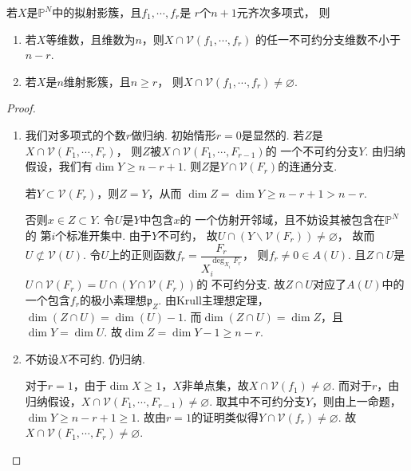     \begin{theorem}
        若$X$是$\mathbb{P}^{N}$中的拟射影簇，且$f_{1},\cdots,f_{r}$是
        $r$个$n+1$元齐次多项式，
        则
        \begin{enumerate}
            \item[(1)] 若$X$等维数，且维数为$n$，则$X \cap \mathcal{V}(f_{1},\cdots,f_{r})$
                       的任一不可约分支维数不小于$n-r$.
            \item[(2)] 若$X$是$n$维射影簇，且$n \geq r$，
                       则$X \cap \mathcal{V}(f_{1},\cdots,f_{r}) \neq \varnothing$.
        \end{enumerate}
    \end{theorem}
    \begin{proof}
        \begin{enumerate}
            \item[(1)] 我们对多项式的个数$r$做归纳. 初始情形$r=0$是显然的.
                       若$Z$是$X \cap \mathcal{V}(F_{1},\cdots,F_{r})$，
                       则$Z$被$X \cap \mathcal{V}(F_{1},\cdots,F_{r-1})$的
                       一个不可约分支$Y$.
                       由归纳假设，我们有$\dim Y \geq n - r + 1$.
                       则$Z$是$Y \cap \mathcal{V}(F_{r})$的连通分支. \par
                       若$Y \subset \mathcal{V}(F_{r})$，则$Z = Y$，从而
                       $\dim Z = \dim Y \geq n - r + 1 > n - r$. \par
                       否则$x \in Z \subset Y$. 令$U$是$Y$中包含$x$的
                       一个仿射开邻域，且不妨设其被包含在$\mathbb{P}^{N}$的
                       第$i$个标准开集中. 由于$Y$不可约，
                       故$U \cap (Y \backslash \mathcal{V}(F_{r})) \neq \varnothing$，
                       故而$U \not\subset \mathcal{V}(U)$. 
                       令$U$上的正则函数$f_{r}=\dfrac{F_{r}}{X_{i}^{\deg_{X_{i}} F_{r}}}$，
                       则$f_{r} \neq 0 \in A(U)$. 且$Z \cap U$是
                       $U \cap \mathcal{V}(F_{r}) = U \cap (Y \cap \mathcal{V}(F_{r}))$的
                       不可约分支.
                       故$Z \cap U$对应了$A(U)$中的一个包含$f_{r}$的极小素理想$\mathfrak{p}_{Z}$. 
                       由Krull主理想定理，$\dim(Z \cap U) = \dim(U) - 1$.
                       而$\dim(Z \cap U) = \dim Z$，且$\dim Y = \dim U$. 
                       故$\dim Z = \dim Y - 1 \geq n - r$. 
            \item[(2)] 不妨设$X$不可约. 仍归纳. \par
                       对于$r=1$，由于$\dim X \geq 1$，$X$非单点集，故$X \cap \mathcal{V}(f_{1}) \neq \varnothing$.
                       而对于$r$，由归纳假设，$X \cap \mathcal{V}(F_{1},\cdots,F_{r-1}) \neq \varnothing$.
                       取其中不可约分支$Y$，则由上一命题，$\dim Y \geq n - r + 1 \geq 1$.
                       故由$r=1$的证明类似得$Y \cap \mathcal{V}(f_{r}) \neq \varnothing$.
                       故$X \cap \mathcal{V}(F_{1},\cdots,F_{r}) \neq \varnothing$.\qedhere
        \end{enumerate}
    \end{proof}

